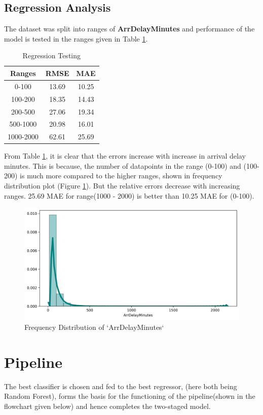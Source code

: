 \documentclass[12pt]{article}
\begin{document}
\subsection{Regression Analysis}
The dataset was split into ranges of \textbf{ArrDelayMinutes} and performance of the model is tested in the ranges given in Table \ref{tab:Table 8}.
\begin{table}[H]
    \centering
    \begin{tabular}{|c|c|c|}
    \hline
        \textbf{Ranges} & \textbf{RMSE} & \textbf{MAE} \\
    \hline
        0-100 & 13.69 & 10.25 \\
    \hline
        100-200 & 18.35 & 14.43\\
    \hline
        200-500 & 27.06 & 19.34\\
    \hline
        500-1000 & 20.98 & 16.01\\
    \hline
        1000-2000 & 62.61 & 25.69\\
    \hline
    \end{tabular}
    \caption{Regression Testing}
    \label{tab:Table 8}
\end{table}
From Table \ref{tab:Table 8}, it is clear that the errors increase with increase in arrival delay minutes. This is because, the number of datapoints in the range (0-100) and (100-200) is much more compared to the higher ranges, shown in frequency distribution plot (Figure \ref{fig:2}). But the relative errors decrease with increasing ranges. 25.69 MAE for range(1000 - 2000) is better than 10.25 MAE for (0-100).
\begin{figure}[H]
    \centering
    \includegraphics[scale=.5]{Frequency Distribution of ArrDelayMinutes.png}
    \caption{Frequency Distribution of `ArrDelayMinutes`}
    \label{fig:2}
\end{figure}
\section{Pipeline}
The best classifier is chosen and fed to the best regressor, (here both being Random Forest), forms the basis for the functioning of the pipeline(shown in the flowchart given below) and hence completes the two-staged model.\\
\end{document}
